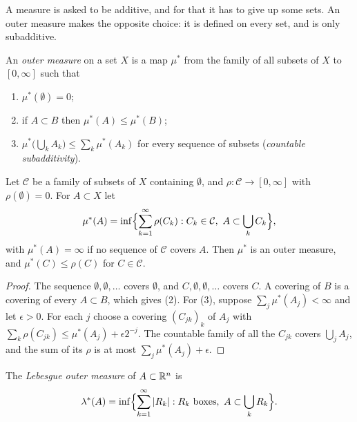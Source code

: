 \begin{notechapter}
A measure is asked to be additive, and for that it has to give up some
sets. An outer measure makes the opposite choice: it is defined on
every set, and is only subadditive.

\begin{definition}\label{caratheodory:def:outer}
An \emph{outer measure} on a set $X$ is a map $\mu^*$ from the family of
all subsets of $X$ to $[0, \infty]$ such that
\begin{enumerate}[nosep]
  \item $\mu^*(\emptyset) = 0$;
  \item if $A\subset B$ then $\mu^*(A)\leq\mu^*(B)$;
  \item $\mu^*\bigl(\bigcup_kA_k\bigr)\leq\sum_k\mu^*(A_k)$ for every
        sequence of subsets (\emph{countable subadditivity}).
\end{enumerate}
\end{definition}

\begin{proposition}
\label{caratheodory:prop:covering}
Let $\mathcal C$ be a family of subsets of $X$ containing $\emptyset$,
and $\rho:\mathcal C\to[0, \infty]$ with $\rho(\emptyset) = 0$. For
$A\subset X$ let
\[
  \mu^*(A) = \inf\Bigl\{\sum_{k=1}^\infty\rho(C_k) :
    C_k\in\mathcal C,\ A\subset\bigcup_kC_k\Bigr\} ,
\]
with $\mu^*(A) = \infty$ if no sequence of $\mathcal C$ covers $A$.
Then $\mu^*$ is an outer measure, and $\mu^*(C)\leq\rho(C)$ for
$C\in\mathcal C$.
\end{proposition}

\begin{proof}
The sequence $\emptyset, \emptyset, \dots$ covers $\emptyset$, and
$C, \emptyset, \emptyset, \dots$ covers $C$. A covering of $B$ is a
covering of every $A\subset B$, which gives (2). For (3), suppose
$\sum_j\mu^*(A_j) < \infty$ and let $\epsilon > 0$. For each $j$ choose
a covering $(C_{jk})_k$ of $A_j$ with
$\sum_k\rho(C_{jk})\leq\mu^*(A_j) + \epsilon2^{-j}$. The countable
family of all the $C_{jk}$ covers $\bigcup_jA_j$, and the sum of its
$\rho$ is at most $\sum_j\mu^*(A_j) + \epsilon$.
\end{proof}

\begin{definition}
\label{caratheodory:def:lebesgue-outer}
The \emph{Lebesgue outer measure} of $A\subset\mathbb{R}^n$ is
\[
  \lambda^*(A) = \inf\Bigl\{\sum_{k=1}^\infty\left|R_k\right| :
    R_k\text{ boxes},\ A\subset\bigcup_kR_k\Bigr\} .
\]
\end{definition}


\end{notechapter}
